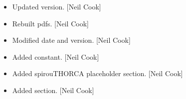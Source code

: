 \documentclass[a4paper,10pt,english]{report}
\begin{document}
\begin{itemize}
\item {} 
Updated version. {[}Neil Cook{]}

\item {} 
Rebuilt pdfs. {[}Neil Cook{]}

\item {} 
Modified date and version. {[}Neil Cook{]}

\item {} 
Added  constant. {[}Neil Cook{]}

\item {} 
Added spirouTHORCA placeholder section. {[}Neil Cook{]}

\item {} 
Added  section. {[}Neil Cook{]}

\end{itemize}
\end{document}
